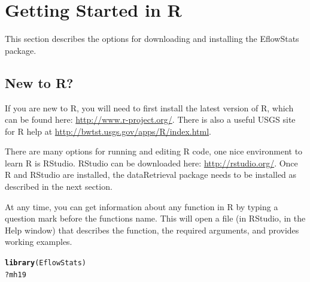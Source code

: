 \documentclass[a4paper,11pt]{article}\usepackage[]{graphicx}\usepackage[]{color}
\makeatletter
\newcommand{\hlopt}[1]{\textcolor[rgb]{0,0,0}{#1}}%
\newcommand{\hlstd}[1]{\textcolor[rgb]{0.345,0.345,0.345}{#1}}%
\newcommand{\hlkwd}[1]{\textcolor[rgb]{0.737,0.353,0.396}{\textbf{#1}}}%
\newenvironment{kframe}{%
 \def\at@end@of@kframe{}%
 \ifinner\ifhmode%
  \def\at@end@of@kframe{\end{minipage}}%
  \begin{minipage}{\columnwidth}%
 \fi\fi%
 \def\FrameCommand##1{\hskip\@totalleftmargin \hskip-\fboxsep
 \colorbox{shadecolor}{##1}\hskip-\fboxsep
     \hskip-\linewidth \hskip-\@totalleftmargin \hskip\columnwidth}%
 \MakeFramed {\advance\hsize-\width
   \@totalleftmargin\z@ \linewidth\hsize
   \@setminipage}}%
 {\par\unskip\endMakeFramed%
 \at@end@of@kframe}
\newenvironment{knitrout}{}{} %
\makeatother
\begin{document}
\FloatBarrier
\clearpage

\section{Getting Started in R}
\label{sec:started}
This section describes the options for downloading and installing the EflowStats package.

\subsection{New to R?}
If you are new to R, you will need to first install the latest version of R, which can be found here: \url{http://www.r-project.org/}. There is also a useful USGS site for R help at \url{http://bwtst.usgs.gov/apps/R/index.html}.

There are many options for running and editing R code, one nice environment to learn R is RStudio. RStudio can be downloaded here: \url{http://rstudio.org/}. Once R and RStudio are installed, the dataRetrieval package needs to be installed as described in the next section.

At any time, you can get information about any function in R by typing a question mark before the functions name.  This will open a file (in RStudio, in the Help window) that describes the function, the required arguments, and provides working examples.

\begin{knitrout}
\color{fgcolor}\begin{kframe}
\begin{alltt}
\hlkwd{library}\hlstd{(EflowStats)}
\hlopt{?}\hlstd{mh19}
\end{alltt}
\end{kframe}
\end{knitrout}
\end{document}
